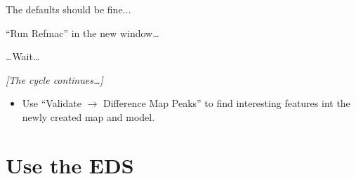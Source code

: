 \documentclass{article}
\begin{document}
The defaults should be fine...

\textsf{``Run Refmac''} in the new window\ldots

\ldots Wait\ldots

\emph{[The cycle continues\ldots]}

\begin{itemize}
\item Use \textsf{``Validate $\rightarrow$ Difference Map Peaks''} to
  find interesting features int the newly created map and model.
\end{itemize}



\section{Use the EDS}
\end{document}
